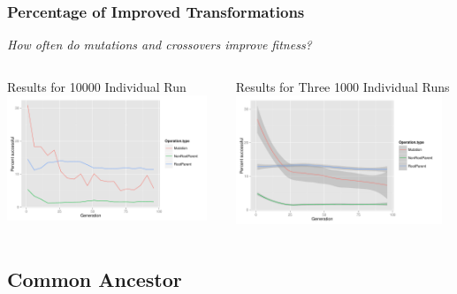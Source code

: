 \documentclass{beamer}
\begin{document}
\begin{frame}
\frametitle{Percentage of Improved Transformations}
\emph{How often do mutations and crossovers improve fitness?}
\begin{columns}
\begin{column}{0.5\textwidth}
\begin{center}
{\tiny Results for 10000 Individual Run}
\includegraphics[width=0.95\textwidth]{Blocked_success_percentages}
\end{center}
\end{column}
\begin{column}{0.5\textwidth}
\begin{center}
{\tiny Results for Three 1000 Individual Runs}
\includegraphics[width=0.95\textwidth]{Percent_successful_Axiom_1K_runs}
\end{center}
\end{column}
\end{columns}
\end{frame}

\subsection[Common Ancestor]{Common Ancestor}
\end{document}
